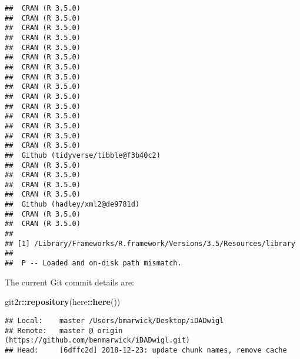 \documentclass[]{elsarticle} %
\newenvironment{Shaded}{\begin{snugshade}}{\end{snugshade}}
\newcommand{\KeywordTok}[1]{\textcolor[rgb]{0.13,0.29,0.53}{\textbf{#1}}}
\newcommand{\NormalTok}[1]{#1}
\newcommand{\OperatorTok}[1]{\textcolor[rgb]{0.81,0.36,0.00}{\textbf{#1}}}
\begin{document}
\begin{verbatim}
##  CRAN (R 3.5.0)                     
##  CRAN (R 3.5.0)                     
##  CRAN (R 3.5.0)                     
##  CRAN (R 3.5.0)                     
##  CRAN (R 3.5.0)                     
##  CRAN (R 3.5.0)                     
##  CRAN (R 3.5.0)                     
##  CRAN (R 3.5.0)                     
##  CRAN (R 3.5.0)                     
##  CRAN (R 3.5.0)                     
##  CRAN (R 3.5.0)                     
##  CRAN (R 3.5.0)                     
##  CRAN (R 3.5.0)                     
##  CRAN (R 3.5.0)                     
##  CRAN (R 3.5.0)                     
##  Github (tidyverse/tibble@f3b40c2)  
##  CRAN (R 3.5.0)                     
##  CRAN (R 3.5.0)                     
##  CRAN (R 3.5.0)                     
##  CRAN (R 3.5.0)                     
##  Github (hadley/xml2@de9781d)       
##  CRAN (R 3.5.0)                     
##  CRAN (R 3.5.0)                     
## 
## [1] /Library/Frameworks/R.framework/Versions/3.5/Resources/library
## 
##  P -- Loaded and on-disk path mismatch.
\end{verbatim}

The current Git commit details are:

\begin{Shaded}
\begin{Highlighting}[]
\NormalTok{git2r}\OperatorTok{::}\KeywordTok{repository}\NormalTok{(here}\OperatorTok{::}\KeywordTok{here}\NormalTok{())}
\end{Highlighting}
\end{Shaded}

\begin{verbatim}
## Local:    master /Users/bmarwick/Desktop/iDADwigl
## Remote:   master @ origin (https://github.com/benmarwick/iDADwigl.git)
## Head:     [6dffc2d] 2018-12-23: update chunk names, remove cache
\end{verbatim}
\end{document}
